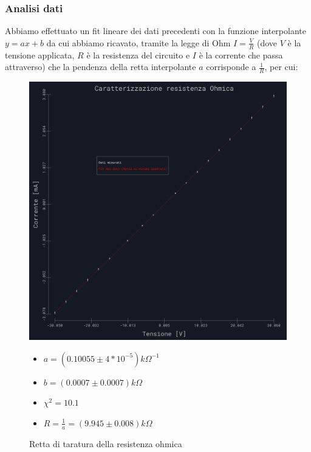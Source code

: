 \documentclass{article}
\begin{document}
\subsubsection{Analisi dati}
Abbiamo effettuato un fit lineare dei dati precedenti con la funzione interpolante $y=ax+b$ da cui abbiamo ricavato, tramite la legge di Ohm $I=\frac{V}{R}$ (dove $V$ è la tensione applicata, $R$ è la resistenza del circuito e $I$ è la corrente che passa attraverso) che la pendenza della retta interpolante $a$ corrisponde a $\frac{1}{R}$, per cui:
\begin{figure}[h]
    \begin{minipage}{0.69\textwidth} %
        \centering
        \includegraphics[width=\linewidth]{../images/grafico1.png} %
        \caption{Retta di taratura della resistenza ohmica}
        \label{grafico:1}
    \end{minipage}
    \hfill %
    \begin{minipage}{0.3\textwidth}    
    \begin{itemize}
        \item $a=(0.10055\pm 4*10^{-5} )k\Omega^{-1}$
        \item $b=(0.0007 \pm 0.0007)k\Omega$
        \item $\chi^2= 10.1$
        \item $R=\frac{1}{a}=( 9.945\pm0.008 )k\Omega$
    \end{itemize}
    \end{minipage}
\end{figure}
\end{document}
